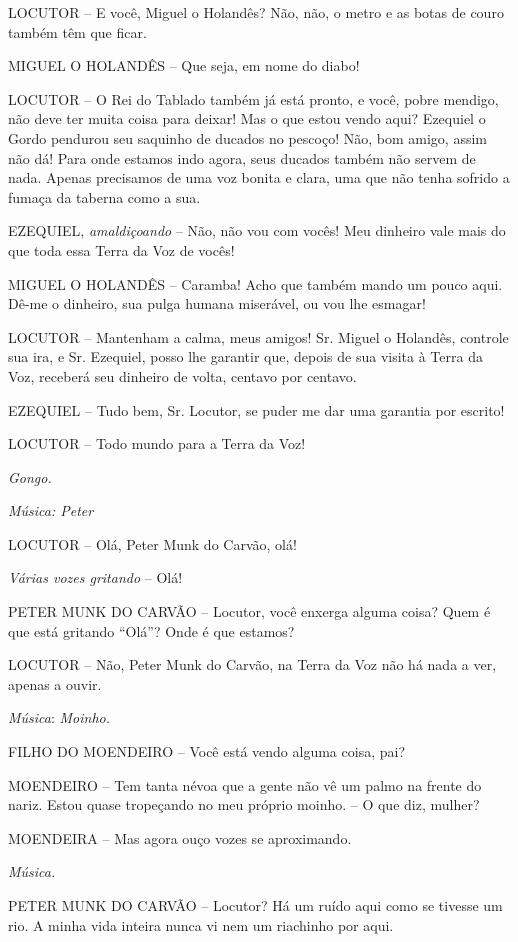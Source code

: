 LOCUTOR -- E você, Miguel o Holandês? Não, não, o metro e as botas de
couro também têm que ficar.

MIGUEL O HOLANDÊS -- Que seja, em nome do diabo!

LOCUTOR -- O Rei do Tablado também já está pronto, e você, pobre
mendigo, não deve ter muita coisa para deixar! Mas o que estou vendo
aqui? Ezequiel o Gordo pendurou seu saquinho de ducados no pescoço! Não,
bom amigo, assim não dá! Para onde estamos indo agora, seus ducados
também não servem de nada. Apenas precisamos de uma voz bonita e clara,
uma que não tenha sofrido a fumaça da taberna como a sua.

EZEQUIEL, \emph{amaldiçoando} -- Não, não vou com vocês! Meu dinheiro
vale mais do que toda essa Terra da Voz de vocês!

MIGUEL O HOLANDÊS -- Caramba! Acho que também mando um pouco aqui. Dê-me
o dinheiro, sua pulga humana miserável, ou vou lhe esmagar!

LOCUTOR -- Mantenham a calma, meus amigos! Sr. Miguel o Holandês,
controle sua ira, e Sr. Ezequiel, posso lhe garantir que, depois de sua
visita à Terra da Voz, receberá seu dinheiro de volta, centavo por
centavo.

EZEQUIEL -- Tudo bem, Sr. Locutor, se puder me dar uma garantia por
escrito!

LOCUTOR -- Todo mundo para a Terra da Voz!

\emph{Gongo.}

\emph{Música: Peter}

LOCUTOR -- Olá, Peter Munk do Carvão, olá!

\emph{Várias vozes gritando} -- Olá!

PETER MUNK DO CARVÃO -- Locutor, você enxerga alguma coisa? Quem é que
está gritando ``Olá''? Onde é que estamos?

LOCUTOR -- Não, Peter Munk do Carvão, na Terra da Voz não há nada a ver,
apenas a ouvir.

\emph{Música}: \emph{Moinho.}

FILHO DO MOENDEIRO -- Você está vendo alguma coisa, pai?

MOENDEIRO -- Tem tanta névoa que a gente não vê um palmo na frente do
nariz. Estou quase tropeçando no meu próprio moinho. -- O que diz,
mulher?

MOENDEIRA -- Mas agora ouço vozes se aproximando.

\emph{Música.}

PETER MUNK DO CARVÃO -- Locutor? Há um ruído aqui como se tivesse um
rio. A minha vida inteira nunca vi nem um riachinho por aqui.

